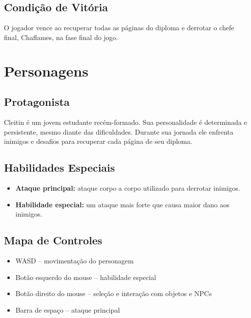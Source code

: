 \documentclass[12pt,a4paper]{article}
\begin{document}
\subsection*{Condição de Vitória}

O jogador vence ao recuperar todas as páginas do diploma e derrotar o chefe final,
Chaflames, na fase final do jogo.

\newpage


\section*{Personagens}

\subsection*{Protagonista}

Cleitin é um jovem estudante recém-formado. Sua personalidade é determinada e persistente, mesmo diante das dificuldades. Durante sua jornada ele enfrenta inimigos e desafios para recuperar cada página de seu diploma.

\subsection*{Habilidades Especiais}

\begin{itemize}
    \item \textbf{Ataque principal:} ataque corpo a corpo utilizado para derrotar inimigos.
    \item \textbf{Habilidade especial:} um ataque mais forte que causa maior dano aos inimigos.
\end{itemize}

\subsection*{Mapa de Controles}

\begin{itemize}
\item WASD – movimentação do personagem
\item Botão esquerdo do mouse – habilidade especial
\item Botão direito do mouse – seleção e interação com objetos e NPCs
\item Barra de espaço – ataque principal
\end{itemize}
\end{document}
